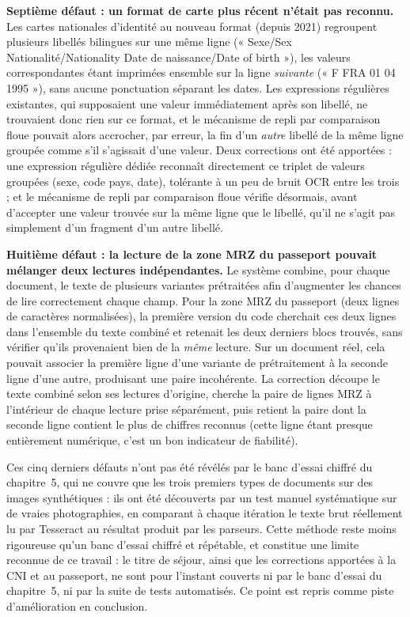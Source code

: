 \textbf{Septième défaut : un format de carte plus récent n'était pas reconnu.} Les cartes nationales d'identité au nouveau format (depuis 2021) regroupent plusieurs libellés bilingues sur une même ligne (« Sexe/Sex Nationalité/Nationality Date de naissance/Date of birth »), les valeurs correspondantes étant imprimées ensemble sur la ligne \emph{suivante} (« F FRA 01 04 1995 »), sans aucune ponctuation séparant les dates. Les expressions régulières existantes, qui supposaient une valeur immédiatement après son libellé, ne trouvaient donc rien sur ce format, et le mécanisme de repli par comparaison floue pouvait alors accrocher, par erreur, la fin d'un \emph{autre} libellé de la même ligne groupée comme s'il s'agissait d'une valeur. Deux corrections ont été apportées : une expression régulière dédiée reconnaît directement ce triplet de valeurs groupées (sexe, code pays, date), tolérante à un peu de bruit OCR entre les trois ; et le mécanisme de repli par comparaison floue vérifie désormais, avant d'accepter une valeur trouvée sur la même ligne que le libellé, qu'il ne s'agit pas simplement d'un fragment d'un autre libellé.

\textbf{Huitième défaut : la lecture de la zone MRZ du passeport pouvait mélanger deux lectures indépendantes.} Le système combine, pour chaque document, le texte de plusieurs variantes prétraitées afin d'augmenter les chances de lire correctement chaque champ. Pour la zone MRZ du passeport (deux lignes de caractères normalisées), la première version du code cherchait ces deux lignes dans l'ensemble du texte combiné et retenait les deux derniers blocs trouvés, sans vérifier qu'ils provenaient bien de la \emph{même} lecture. Sur un document réel, cela pouvait associer la première ligne d'une variante de prétraitement à la seconde ligne d'une autre, produisant une paire incohérente. La correction découpe le texte combiné selon ses lectures d'origine, cherche la paire de lignes MRZ à l'intérieur de chaque lecture prise séparément, puis retient la paire dont la seconde ligne contient le plus de chiffres reconnus (cette ligne étant presque entièrement numérique, c'est un bon indicateur de fiabilité).

Ces cinq derniers défauts n'ont pas été révélés par le banc d'essai chiffré du chapitre~5, qui ne couvre que les trois premiers types de documents sur des images synthétiques : ils ont été découverts par un test manuel systématique sur de vraies photographies, en comparant à chaque itération le texte brut réellement lu par Tesseract au résultat produit par les parseurs. Cette méthode reste moins rigoureuse qu'un banc d'essai chiffré et répétable, et constitue une limite reconnue de ce travail : le titre de séjour, ainsi que les corrections apportées à la CNI et au passeport, ne sont pour l'instant couverts ni par le banc d'essai du chapitre~5, ni par la suite de tests automatisés. Ce point est repris comme piste d'amélioration en conclusion.

